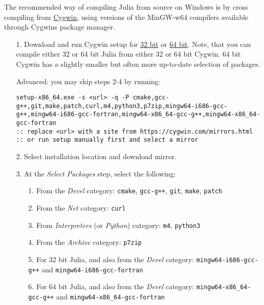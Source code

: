 The recommended way of compiling Julia from source on Windows is by cross compiling from \href{https://www.cygwin.com}{Cygwin}, using versions of the MinGW-w64 compilers available through Cygwin{\textquotesingle}s package manager.



\begin{itemize}
\item[1. ] Download and run Cygwin setup for \href{https://cygwin.com/setup-x86.exe}{32 bit} or \href{https://cygwin.com/setup-x86\_64.exe}{64 bit}. Note, that you can compile either 32 or 64 bit Julia from either 32 or 64 bit Cygwin. 64 bit Cygwin has a slightly smaller but often more up-to-date selection of packages.

Advanced: you may skip steps 2-4 by running:


\begin{lstlisting}
setup-x86_64.exe -s <url> -q -P cmake,gcc-g++,git,make,patch,curl,m4,python3,p7zip,mingw64-i686-gcc-g++,mingw64-i686-gcc-fortran,mingw64-x86_64-gcc-g++,mingw64-x86_64-gcc-fortran
:: replace <url> with a site from https://cygwin.com/mirrors.html
:: or run setup manually first and select a mirror
\end{lstlisting}


\item[2. ] Select installation location and download mirror.


\item[3. ] At the {\textquotesingle}\emph{Select Packages{\textquotesingle}} step, select the following:

\begin{itemize}
\item[1. ] From the \emph{Devel} category: \texttt{cmake}, \texttt{gcc-g++}, \texttt{git}, \texttt{make}, \texttt{patch}


\item[2. ] From the \emph{Net} category: \texttt{curl}


\item[3. ] From \emph{Interpreters} (or \emph{Python}) category: \texttt{m4}, \texttt{python3}


\item[4. ] From the \emph{Archive} category: \texttt{p7zip}


\item[5. ] For 32 bit Julia, and also from the \emph{Devel} category:  \texttt{mingw64-i686-gcc-g++} and \texttt{mingw64-i686-gcc-fortran}


\item[6. ] For 64 bit Julia, and also from the \emph{Devel} category:  \texttt{mingw64-x86\_64-gcc-g++} and \texttt{mingw64-x86\_64-gcc-fortran}


\end{itemize}
\end{itemize}
